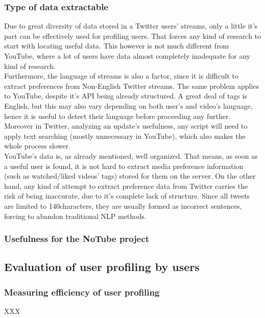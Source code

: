 \subsubsection{Type of data extractable}
Due to great diversity of data stored in a Twitter users' streams, only a little it's part can be effectively used for profiling
users. That forces any kind of research to start with locating useful data. This however is not much different from YouTube, where
a lot of users have data almost completely inadequate for any kind of research.
\\ Furthermore, the language of streams is also a factor, since it is difficult to extract preferences from Non-English Twitter
streams. The same problem applies to YouTube, despite it's API being already structured. A great deal of tags is English,
but this may also vary depending on both user's and video's language, hence it is useful to detect their language before
proceeding any further. Moreover in Twitter, analyzing an update's usefulness, any script will need to apply text searching (mostly
unnecessary in YouTube), which also makes the whole process slower.
\\ YouTube's data is, as already mentioned, well organized. That means, as soon as a useful user is found, it is not hard to
extract media preference information (such as watched/liked videos' tags) stored for them on the server. On the other hand,
any kind of attempt to extract preference data from Twitter carries the risk of being inaccurate, due to it's complete lack of structure.
Since all tweets are limited to 140characters, they are usually formed as incorrect sentences, forcing to abandon traditional
NLP methods.

\subsubsection{Usefulness for the NoTube project}

\subsection{Evaluation of user profiling by users}
\subsubsection{Measuring efficiency of user profiling}
XXX
